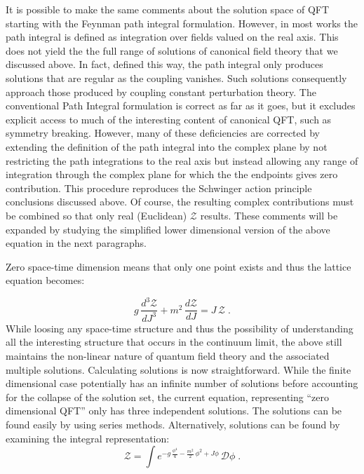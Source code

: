 \documentclass[12pt]{article}
\begin{document}
 
It is possible to make the same comments about the solution space of QFT
starting with the Feynman path integral formulation. However, in most works
the path integral is defined as integration over fields valued on the real
axis. This does not yield the the full range of solutions of canonical field
theory that we discussed above. In fact, defined this way, the path integral
only produces solutions that are regular as the coupling vanishes. Such solutions
consequently approach those produced by coupling constant perturbation theory. The
conventional Path Integral formulation is correct as far as it goes, but it
excludes explicit access to much of the interesting content of canonical QFT,
such as symmetry breaking. However, many of these deficiencies are
corrected by extending the definition of the path integral into the complex
plane by not restricting the path integrations to the real axis but instead
allowing any range of integration through the complex plane for which the the
endpoints gives zero contribution. This procedure reproduces the Schwinger
action principle conclusions discussed above. Of course, the resulting complex
contributions must be combined so that only real (Euclidean) $\mathcal{Z}$
results. These comments will be expanded by studying the simplified lower
dimensional version of the above equation in the next paragraphs.

Zero space-time dimension means that only one point exists and thus the
lattice equation becomes:

  \begin{equation*}
    g\, \frac{d^3 \mathcal{Z}}{d J^3} + m^2\, \frac{d \mathcal{Z}}{d J} = J\, \mathcal{Z} \; .
  \end{equation*}
  While loosing any space-time structure and thus the possibility of
  understanding all the interesting structure that occurs in the continuum
  limit, the above still maintains the non-linear nature of quantum field
  theory and the associated multiple solutions.  Calculating solutions is now
  straightforward.  While the finite dimensional case potentially has an
  infinite number of solutions before accounting for the collapse of the
  solution set, the current equation, representing ``zero dimensional QFT''
  only has three independent solutions. The solutions can be found easily by
  using series methods. Alternatively, solutions can be found by examining the
  integral representation:
    \begin{equation*}
      \mathcal{Z} = \int e^{-g\, \frac{\phi^4}{4} -
        \frac{m^2}{2}\,\phi^{2} + J\phi}\, \mathcal{D}\phi \; .
    \end{equation*}
\end{document}

